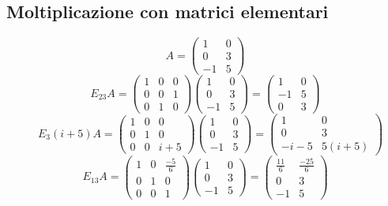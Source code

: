 \documentclass[a4paper]{article}
\theoremstyle{break}
\theoremstyle{break}
\theoremstyle{break}
\theoremstyle{break}
\begin{document}
\subsection{Moltiplicazione con matrici elementari}
\begin{figure}[H]
  \begin{example}
    \[
      A = \begin{pmatrix} 
        1 & 0\\
        0 & 3\\
        -1 & 5
      \end{pmatrix} 
    \] 
    \[
      E_{23}A = \begin{pmatrix} 
        1 & 0 & 0\\
        0 & 0 & 1\\
        0 & 1 & 0
      \end{pmatrix}
      \begin{pmatrix} 
        1 & 0\\
        0 & 3\\
        -1 & 5
      \end{pmatrix}
      =
      \begin{pmatrix} 
        1 & 0\\
        -1 & 5\\
        0 & 3
      \end{pmatrix}
    \] 
    \[
      E_3(i+5)A = \begin{pmatrix} 
        1 & 0 & 0\\
        0 & 1 & 0\\
        0 & 0 & i+5
      \end{pmatrix}
      \begin{pmatrix} 
        1 & 0\\
        0 & 3\\
        -1 & 5
      \end{pmatrix}
      =
      \begin{pmatrix} 
        1 & 0\\
        0 & 3\\
        -i-5 & 5(i+5)
      \end{pmatrix}
    \] 
    \[
      E_{13}A = \begin{pmatrix} 
        1 & 0 & \frac{-5}{6}\\
        0 & 1 & 0\\
        0 & 0 & 1
      \end{pmatrix}
      \begin{pmatrix} 
        1 & 0\\
        0 & 3\\
        -1 & 5
      \end{pmatrix}
      =
      \begin{pmatrix} 
        \frac{11}{6} & \frac{-25}{6}\\
        0 & 3\\
        -1 & 5
      \end{pmatrix}
    \] 
  \end{example}
\end{figure}
\end{document}
